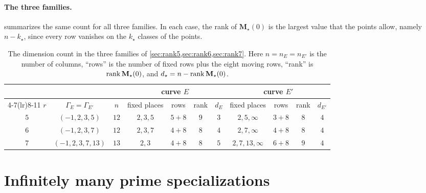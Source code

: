 \paragraph{The three families.}  summarizes the same count for all three families. In each case, the rank of $\mathbf M_\star(0)$ is the largest value that the points allow, namely $n-k_\star$, since every row vanishes on the $k_\star$ classes of the points.

\begin{table}[htbp]
\centering
\caption{The dimension count in the three families of \cref{sec:rank5,sec:rank6,sec:rank7}. Here $n=n_E=n_{E'}$ is the number of columns, ``rows'' is the number of fixed rows plus the eight moving rows, ``rank'' is $\operatorname{rank}\mathbf M_\star(0)$, and $d_\star=n-\operatorname{rank}\mathbf M_\star(0)$.}
\label{tab:overview-count}
\small
\setlength{\tabcolsep}{4.5pt}
\begin{tabular}{@{}ccccccccccc@{}}
\toprule
& & & \multicolumn{4}{c}{curve $E$} & \multicolumn{4}{c}{curve $E'$}\\
\cmidrule(lr){4-7}\cmidrule(lr){8-11}
$r$ & $\Gamma_E=\Gamma_{E'}$ & $n$ & fixed places & rows & rank & $d_E$ & fixed places & rows & rank & $d_{E'}$\\
\midrule
$5$ & $(-1,2,3,5)$ & $12$ & $2,3,5$ & $5+8$ & $9$ & $3$ & $2,5,\infty$ & $3+8$ & $8$ & $4$\\
$6$ & $(-1,2,3,7)$ & $12$ & $2,3,7$ & $4+8$ & $8$ & $4$ & $2,7,\infty$ & $4+8$ & $8$ & $4$\\
$7$ & $(-1,2,3,7,13)$ & $13$ & $2,3$ & $4+8$ & $8$ & $5$ & $2,7,13,\infty$ & $6+8$ & $9$ & $4$\\
\bottomrule
\end{tabular}
\end{table}

\section{Infinitely many prime specializations}\label{sec:overview-primes}

